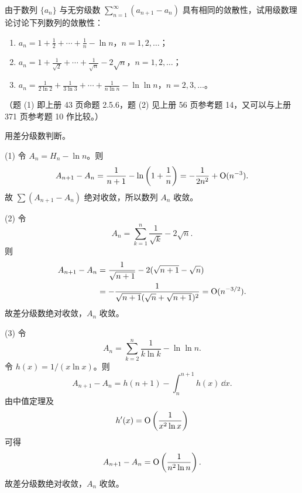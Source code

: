 \begin{xreferenceproblem}[5]
由于数列 $\{a_n\}$ 与无穷级数 $\sum_{n=1}^{\infty}(a_{n+1}-a_n)$ 具有相同的敛散性，试用级数理论讨论下列数列的敛散性：
\begin{enumerate}[label=(\arabic*)]
\item $a_n=1+\frac12+\cdots+\frac1n-\ln n$，$n=1,2,\ldots$；
\item $a_n=1+\frac1{\sqrt2}+\cdots+\frac1{\sqrt n}-2\sqrt n$，$n=1,2,\ldots$；
\item $a_n=\frac1{2\ln2}+\frac1{3\ln3}+\cdots+\frac1{n\ln n}-\ln\ln n$，$n=2,3,\ldots$。
\end{enumerate}
（题 (1) 即上册 43 页命题 2.5.6，题 (2) 见上册 56 页参考题 14，又可以与上册 371 页参考题 10 作比较。）
\end{xreferenceproblem}
\begin{xsolution}
用差分级数判断。

(1) 令 $A_n=H_n-\ln n$。则
\[
 A_{n+1}-A_n
 =\frac1{n+1}-\ln\left(1+\frac1n\right)
 =-\frac1{2n^2}+\mathrm{O}(n^{-3}).
\]
故 $\sum(A_{n+1}-A_n)$ 绝对收敛，所以数列 $A_n$ 收敛。

(2) 令
\[
 A_n=\sum_{k=1}^{n}\frac1{\sqrt k}-2\sqrt n.
\]
则
\[
 \begin{aligned}
 A_{n+1}-A_n
 &=\frac1{\sqrt{n+1}}-2(\sqrt{n+1}-\sqrt n)\\
 &=-\frac1{\sqrt{n+1}(\sqrt n+\sqrt{n+1})^2}
 =\mathrm{O}(n^{-3/2}).
 \end{aligned}
\]
故差分级数绝对收敛，$A_n$ 收敛。

(3) 令
\[
 A_n=\sum_{k=2}^{n}\frac1{k\ln k}-\ln\ln n.
\]
令 $h(x)=1/(x\ln x)$。则
\[
 A_{n+1}-A_n=h(n+1)-\int_n^{n+1}h(x)\,\dd x.
\]
由中值定理及
\[
 h'(x)=\mathrm{O}\left(\frac1{x^2\ln x}\right)
\]
可得
\[
 A_{n+1}-A_n=\mathrm{O}\left(\frac1{n^2\ln n}\right).
\]
故差分级数绝对收敛，$A_n$ 收敛。
\end{xsolution}


